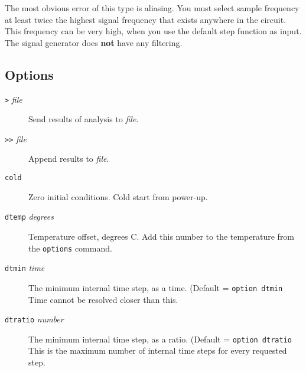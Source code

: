 The most obvious error of this type is aliasing.  You must select sample
frequency at least twice the highest signal frequency that exists anywhere in
the circuit.  This frequency can be very high, when you use the default step
function as input.  The signal generator does {\bf not} have any filtering.
\subsection{Options}

\begin{description}


\item[{\tt >} {\it file}]
Send results of analysis to {\it file}.

\item[{\tt >>} {\it file}]
Append results to {\it file}.



\item[{\tt cold}]
Zero initial conditions.  Cold start from power-up.



\item[{\tt dtemp} {\it degrees}]
Temperature offset, degrees C.  Add this number to the temperature
from the {\tt options} command.

\item[{\tt dtmin} {\it time}]
The minimum internal time step, as a time.  (Default = {\tt option
dtmin} Time cannot be resolved closer than this.

\item[{\tt dtratio} {\it number}]
The minimum internal time step, as a ratio.  (Default = {\tt option
dtratio} This is the maximum number of internal time steps for every
requested step.


\end{description}
